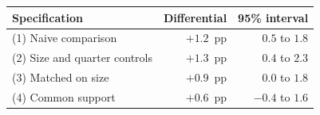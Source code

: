 \begin{tabular}{lrr}
\toprule
Specification & Differential & 95\% interval \\
\midrule
(1) Naive comparison & $+1.2$~pp & $0.5$ to $1.8$ \\
(2) Size and quarter controls & $+1.3$~pp & $0.4$ to $2.3$ \\
(3) Matched on size & $+0.9$~pp & $0.0$ to $1.8$ \\
(4) Common support & $+0.6$~pp & $-0.4$ to $1.6$ \\
\bottomrule
\end{tabular}
